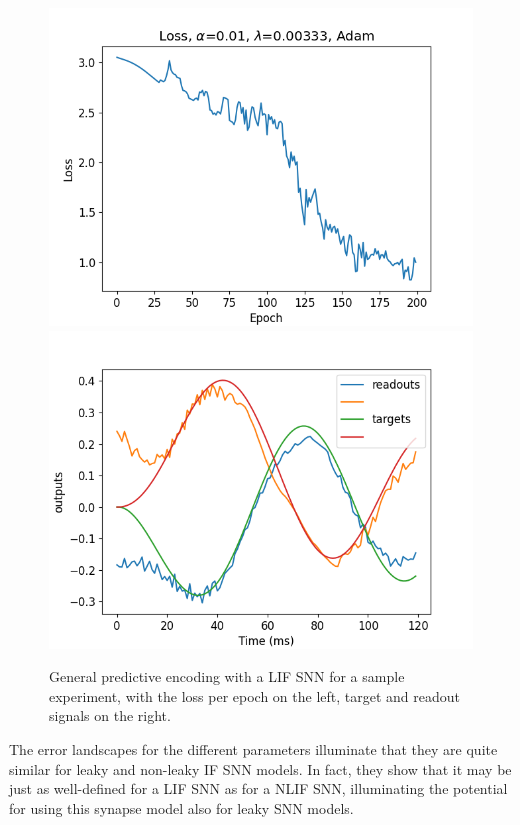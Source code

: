\documentclass[mphil,deptreport,ianc]{infthesis} %
\begin{document}
\begin{figure}
    \centering
    \includegraphics[width=0.49\columnwidth]{figures/Gating/GeneralPredictiveEncoding/LIF_sample/plot_loss_test_mt_LIF_et_GeneralPredictiveEncoding_N_30_titers_200.png}
    \includegraphics[width=0.49\columnwidth]{figures/Gating/GeneralPredictiveEncoding/LIF_sample/test_plot_outputs_LIF_seed_24.png}
    \caption{General predictive encoding with a LIF SNN for a sample experiment, with the loss per epoch on the left, target and readout signals on the right.}
    \label{fig:general_predictive_LIF}
\end{figure}


The error landscapes for the different parameters illuminate that they are quite similar for leaky and non-leaky IF SNN models.
In fact, they show that it may be just as well-defined for a LIF SNN as for a NLIF SNN, illuminating the potential for using this synapse model also for leaky SNN models.
\end{document}
